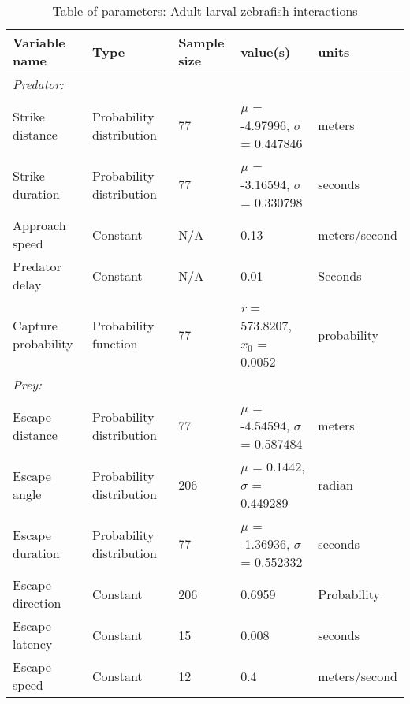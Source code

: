 \documentclass[]{rsos}%
\begin{document}
\begin{table}[!h]
\scriptsize
\caption{Table of parameters: Adult-larval zebrafish interactions}%
\label{table_example}
\begin{tabular}{lllll}%
\hline
Variable name &Type &Sample size &value(s) &units \\
\hline
\textit{Predator:}& & & & \\
Strike distance &Probability distribution &77 &$\mu$ = -4.97996, $\sigma$ = 0.447846 &meters \\
Strike duration &Probability distribution &77 &$\mu$ = -3.16594, $\sigma$ = 0.330798 &seconds \\
Approach speed &Constant &N/A &0.13 &meters/second \\
Predator delay &Constant &N/A &0.01 &Seconds \\
Capture probability &Probability function &77 &\textit{r} = 573.8207, \textit{$x_0$} = 0.0052  &probability \\
\textit{Prey:}& & & & \\
Escape distance &Probability distribution &77 &$\mu$ = -4.54594, $\sigma$ = 0.587484 &meters \\
Escape angle &Probability distribution &206 &$\mu$ = 0.1442, $\sigma$ = 0.449289 &radian \\
Escape duration &Probability distribution &77 &$\mu$ = -1.36936, $\sigma$ = 0.552332 &seconds \\
Escape direction &Constant &206 &0.6959 &Probability \\
Escape latency &Constant &15 &0.008 &seconds \\
Escape speed &Constant &12 &0.4 &meters/second \\\hline
\end{tabular}
\end{table}%
\end{document}
